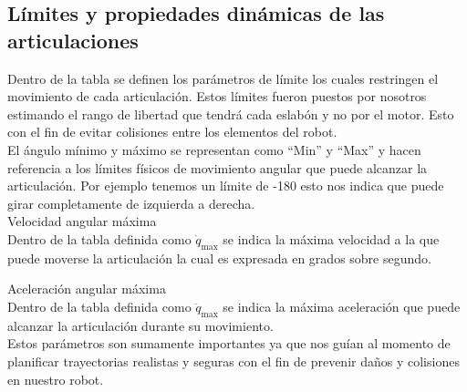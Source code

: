 \subsection{Límites y propiedades dinámicas de las articulaciones} \label{subsec:limites_propiedades}

Dentro de la tabla  se definen los parámetros de límite los cuales restringen el movimiento de cada articulación. Estos límites fueron puestos por nosotros estimando el rango de libertad que tendrá cada eslabón y no por el motor. Esto con el fin de evitar colisiones entre los elementos del robot. \\[5pt] 
El ángulo mínimo y máximo se representan como “Min” y “Max” y hacen referencia a los límites físicos de movimiento angular que puede alcanzar la articulación. Por ejemplo tenemos un límite de -180 esto nos indica que puede girar completamente de izquierda a derecha.\\[5pt]

Velocidad angular máxima \\[5pt]
Dentro de la tabla definida como $\dot{q}_{\text{max}}$ se indica la máxima velocidad a la que puede moverse la articulación la cual es expresada en grados sobre segundo. 

Aceleración angular máxima \\[5pt]
Dentro de la tabla definida como $\ddot{q}_{\text{max}}$ se indica la máxima aceleración que puede alcanzar la articulación durante su movimiento. 
\\[5pt]
Estos parámetros son sumamente importantes ya que nos guían al momento de planificar trayectorias realistas y seguras con el fin de prevenir daños y colisiones en nuestro robot. 
